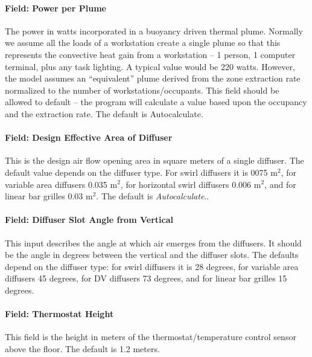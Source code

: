 \paragraph{Field: Power per Plume}\label{field-power-per-plume-1}

The power in watts incorporated in a buoyancy driven thermal plume. Normally we assume all the loads of a workstation create a single plume so that this represents the convective heat gain from a workstation -- 1 person, 1 computer terminal, plus any task lighting. A typical value would be 220 watts. However, the model assumes an ``equivalent'' plume derived from the zone extraction rate normalized to the number of workstations/occupants. This field should be allowed to default -- the program will calculate a value based upon the occupancy and the extraction rate. The default is Autocalculate.

\paragraph{Field: Design Effective Area of Diffuser}\label{field-design-effective-area-of-diffuser-1}

This is the design air flow opening area in square meters of a single diffuser. The default value depends on the diffuser type. For swirl diffusers it is 0075 m\(^{2}\), for variable area diffusers 0.035 m\(^{2}\), for horizontal swirl diffusers 0.006 m\(^{2}\), and for linear bar grilles 0.03 m\(^{2}\). The default is \emph{Autocalculate}..

\paragraph{Field: Diffuser Slot Angle from Vertical}\label{field-diffuser-slot-angle-from-vertical-1}

This input describes the angle at which air emerges from the diffusers. It should be the angle in degrees between the vertical and the diffuser slots. The defaults depend on the diffuser type: for swirl diffusers it is 28 degrees, for variable area diffusers 45 degrees, for DV diffusers 73 degrees, and for linear bar grilles 15 degrees.

\paragraph{Field: Thermostat Height}\label{field-thermostat-height-3}

This field is the height in meters of the thermostat/temperature control sensor above the floor. The default is 1.2 meters.

